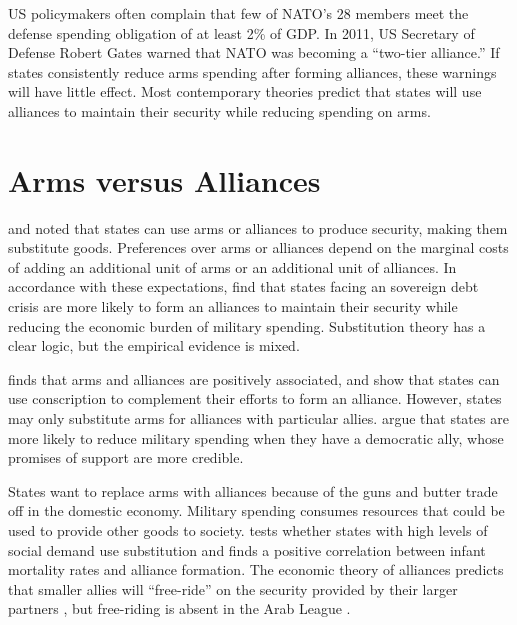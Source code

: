 \documentclass[12pt]{article}
\begin{document}
US policymakers often complain that few of NATO's 28 members meet the defense spending obligation of at least 2\% of GDP. In 2011, US Secretary of Defense Robert Gates warned that NATO was becoming a ``two-tier alliance.'' If states consistently reduce arms spending after forming alliances, these warnings will have little effect. Most contemporary theories predict that states will use alliances to maintain their security while reducing spending on arms. 


\section*{Arms versus Alliances}


\citet{Altfield1984} and \citet{Morrow1993} noted that states can use arms or alliances to produce security, making them substitute goods. Preferences over arms or alliances depend on the marginal costs of adding an additional unit of arms or an additional unit of alliances. In accordance with these expectations, \citet{AllenDigiuseppe2013} find that states facing an sovereign debt crisis are more likely to form an alliances to maintain their security while reducing the economic burden of military spending. Substitution theory has a clear logic, but the empirical evidence is mixed. 

\citet{Diehl1994} finds that arms and alliances are positively associated, and \citet{Horowitzetal2017} show that states can use conscription to complement their efforts to form an alliance. However, states may only substitute arms for alliances with particular allies. \citet{DigiuseppePoast2016} argue that states are more likely to reduce military spending when they have a democratic ally, whose promises of support are more credible. 

States want to replace arms with alliances because of the guns and butter trade off in the domestic economy. Military spending consumes resources that could be used to provide other goods to society. \citet{Kimball2010} tests whether states with high levels of social demand use substitution and finds a positive correlation between infant mortality rates and alliance formation. The economic theory of alliances predicts that smaller allies will ``free-ride'' on the security provided by their larger partners \citep{SandlerHartley2001, Lake2009}, but free-riding is absent in the Arab League \citep{Chenetal1996}. 
\end{document}
